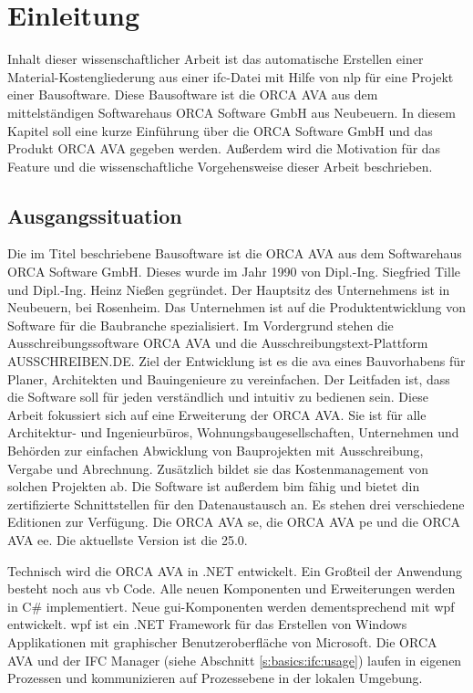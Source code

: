\section{Einleitung}
\label{s:intro}

Inhalt dieser wissenschaftlicher Arbeit ist das automatische Erstellen einer Material-Kostengliederung aus einer \ac{ifc}-Datei mit Hilfe von \ac{nlp} für eine Projekt einer Bausoftware. Diese Bausoftware ist die ORCA AVA aus dem mittelständigen Softwarehaus \glqq ORCA Software GmbH\grqq{} aus Neubeuern. 
In diesem Kapitel soll eine kurze Einführung über die \glqq ORCA Software GmbH\grqq{} und das Produkt  ORCA AVA gegeben werden. Außerdem wird die Motivation für das Feature und die wissenschaftliche Vorgehensweise dieser Arbeit beschrieben.

\subsection{Ausgangssituation}
\label{c:intro:start}

Die im Titel beschriebene Bausoftware ist die ORCA AVA aus dem Softwarehaus \glqq ORCA Software GmbH\grqq{}. Dieses wurde im Jahr 1990 von Dipl.-Ing. Siegfried Tille und Dipl.-Ing. Heinz Nießen gegründet. Der Hauptsitz des Unternehmens ist in Neubeuern, bei Rosenheim. Das Unternehmen ist auf die Produktentwicklung von Software für die Baubranche spezialisiert. Im Vordergrund stehen die Ausschreibungssoftware ORCA AVA und die Ausschreibungstext-Plattform AUSSCHREIBEN.DE. Ziel der Entwicklung ist es die \ac{ava} eines Bauvorhabens für Planer, Architekten und Bauingenieure zu vereinfachen. Der Leitfaden ist, dass die Software soll für jeden verständlich und intuitiv zu bedienen sein.
Diese Arbeit fokussiert sich auf eine Erweiterung der ORCA AVA. Sie ist für alle Architektur- und
Ingenieurbüros, Wohnungsbaugesellschaften, Unternehmen und Behörden zur einfachen Abwicklung von Bauprojekten mit Ausschreibung, Vergabe und Abrechnung. Zusätzlich bildet sie das Kostenmanagement von solchen Projekten ab. Die Software ist außerdem \ac{bim} fähig und bietet \ac{din} zertifizierte Schnittstellen für den Datenaustausch an. Es stehen drei verschiedene Editionen zur Verfügung. Die ORCA AVA \ac{se}, die ORCA AVA \ac{pe} und die ORCA AVA \ac{ee}.  Die aktuellste Version ist die 25.0.

Technisch wird die ORCA AVA in .NET entwickelt. Ein Großteil der Anwendung besteht noch aus \ac{vb} Code. Alle neuen Komponenten und Erweiterungen werden in C\# implementiert. Neue \ac{gui}-Komponenten werden dementsprechend mit \ac{wpf} entwickelt. \ac{wpf} ist ein .NET Framework für das Erstellen von Windows Applikationen mit graphischer Benutzeroberfläche von Microsoft. \citep{Microsoft_2022} Die ORCA AVA und der IFC Manager (siehe Abschnitt \ref{s:basics:ifc:usage}) laufen in eigenen Prozessen und kommunizieren auf Prozessebene in der lokalen Umgebung. 

